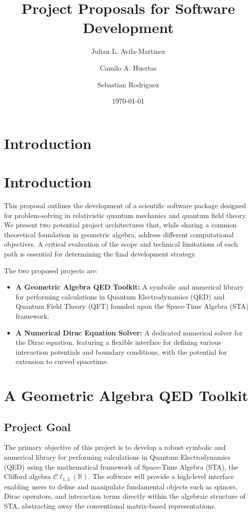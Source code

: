 \documentclass[11pt, letterpaper]{article}
\title{Project Proposals for Software Development}
\author[1]{Julian L. Avila-Martinez}
\author[1]{Camilo A. Huertas}
\author[1]{Sebastian Rodriguez}
\affil[1]{Programa Académico de Física, Facultad de Ciencias Matemáticas y
	Naturales, Universidad Distrital Francisco José de Caldas, Bogotá D.C.,
	Colombia}
\date{\today}
\theoremstyle{definition}
\theoremstyle{remark}
\begin{document}
\maketitle

\section{Introduction}

\section{Introduction}
This proposal outlines the development of a scientific software package designed
for problem-solving in relativistic quantum mechanics and quantum field theory.
We present two potential project architectures that, while sharing a common
theoretical foundation in geometric algebra, address different computational
objectives. A critical evaluation of the scope and technical limitations of each
path is essential for determining the final development strategy.

The two proposed projects are:
\begin{itemize}
	\item \textbf{A Geometric Algebra QED Toolkit:} A symbolic and numerical
		library for performing calculations in Quantum Electrodynamics (QED) and
		Quantum Field Theory (QFT) founded upon the Space-Time Algebra (STA)
		framework.
	\item \textbf{A Numerical Dirac Equation Solver:} A dedicated numerical solver
		for the Dirac equation, featuring a flexible interface for defining various
		interaction potentials and boundary conditions, with the potential for
		extension to curved spacetime.
\end{itemize}

\section{A Geometric Algebra QED Toolkit}

\subsection{Project Goal}
The primary objective of this project is to develop a robust symbolic and
numerical library for performing calculations in Quantum Electrodynamics (QED)
using the mathematical framework of Space-Time Algebra (STA), the Clifford
algebra $\mathcal{C}\ell_{1,3}(\mathbb{R})$. The software will provide a
high-level interface enabling users to define and manipulate fundamental objects
such as spinors, Dirac operators, and interaction terms directly within the
algebraic structure of STA, abstracting away the conventional matrix-based
representations.
\end{document}
